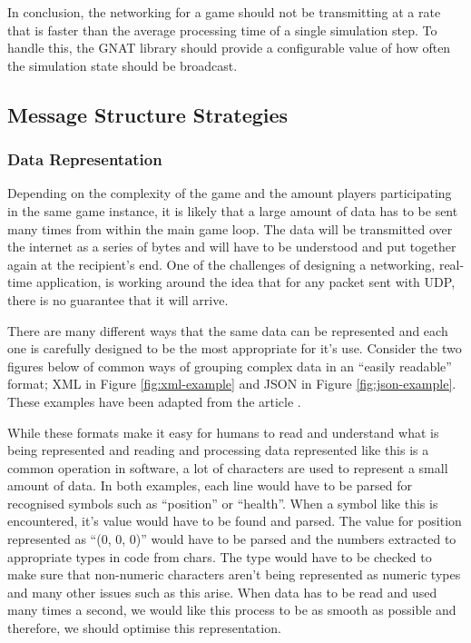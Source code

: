 In conclusion, the networking for a game should not be transmitting at a rate that is faster than the average processing time of a single simulation step. To handle this, the GNAT library should provide a configurable value of how often the simulation state should be broadcast.


\subsection{Message Structure Strategies}
\subsubsection{Data Representation}
Depending on the complexity of the game and the amount players participating in the same game instance, it is likely that a large amount of data has to be sent many times from within the main game loop. The data will be transmitted over the internet as a series of bytes and will have to be understood and put together again at the recipient's end. One of the challenges of designing a networking, real-time application, is working around the idea that for any packet sent with UDP, there is no guarantee that it will arrive.

There are many different ways that the same data can be represented and each one is carefully designed to be the most appropriate for it's use. Consider the two figures below of common ways of grouping complex data in an ``easily readable'' format; XML in Figure \ref{fig:xml-example} and JSON in Figure \ref{fig:json-example}. These examples have been adapted from the article .

While these formats make it easy for humans to read and understand what is being represented and reading and processing data represented like this is a common operation in software, a lot of characters are used to represent a small amount of data. In both examples, each line would have to be parsed for recognised symbols such as ``position'' or ``health''. When a symbol like this is encountered, it's value would have to be found and parsed. The value for position represented as ``(0, 0, 0)'' would have to be parsed and the numbers extracted to appropriate types in code from chars. The type would have to be checked to make sure that non-numeric characters aren't being represented as numeric types and many other issues such as this arise. When data has to be read and used many times a second, we would like this process to be as smooth as possible and therefore, we should optimise this representation.

